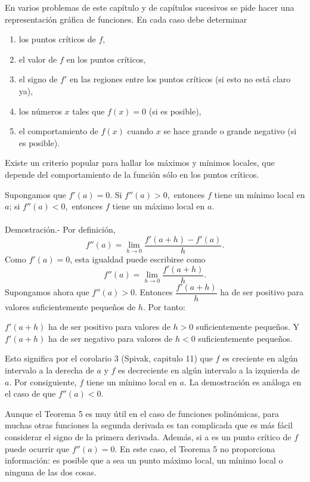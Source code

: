 En varios problemas de este capítulo y de capítulos sucesivos se pide hacer una representación gráfica de funciones. En cada caso debe determinar

\begin{enumerate}[(1)]
    \item los puntos críticos de $f$,
    \item el valor de $f$ en los puntos críticos,
    \item el signo de $f'$ en las regiones entre los puntos críticos (si esto no está claro ya),
    \item los números $x$ tales que $f(x)=0$ (si es posible),
    \item el comportamiento de $f(x)$ cuando $x$ se hace grande o grande negativo (si es posible).
\end{enumerate}

Existe un criterio popular para hallar los máximos y mínimos locales, que depende del comportamiento de la función sólo en los puntos críticos.\\

\begin{teo}
    Supongamos que $f'(a)=0.$ Si $f''(a)>0,$ entonces $f$ tiene un mínimo local en $a$; si $f''(a)<0,$ entonces $f$ tiene un máximo local en $a.$\\\\
	Demostración.-\; Por definición,
	$$f''(a)=\lim_{h\to 0}\dfrac{f'(a+h)-f'(a)}{h}.$$
	Como $f'(a)=0$, esta igualdad puede escribirse como
	$$f''(a)=\lim_{h\to 0}\dfrac{f'(a+h)}{h}.$$
	Supongamos ahora que $f''(a)>0$. Entonces $\dfrac{f'(a+h)}{h}$ ha de ser positivo para valores suficientemente pequeños de $h$. Por tanto:
	\begin{center}
	    $f'(a+h)$ ha de ser positivo para valores de $h>0$ suficientemente pequeños. Y
	    $f'(a+h)$ ha de ser negativo para valores de $h<0$ suficientemente pequeños.
	\end{center}
	Esto significa por el corolario 3 (Spivak, capitulo 11) que $f$ es creciente en algún intervalo a la derecha de $a$ y $f$ es decreciente en algún intervalo a la izquierda de $a$. Por consiguiente, $f$ tiene un mínimo local en $a$. La demostración es análoga en el caso de que $f''(a)<0.$\\
\end{teo}

Aunque el Teorema 5 es muy útil en el caso de funciones polinómicas, para muchas otras funciones la segunda derivada es tan complicada que es más fácil considerar el signo de la primera derivada. Además, si a es un punto crítico de $f$ puede ocurrir que $f''(a)=0$. En este caso, el Teorema 5 no proporciona información: es posible que a sea un punto máximo local, un mínimo local o ninguna de las dos cosas.\\


